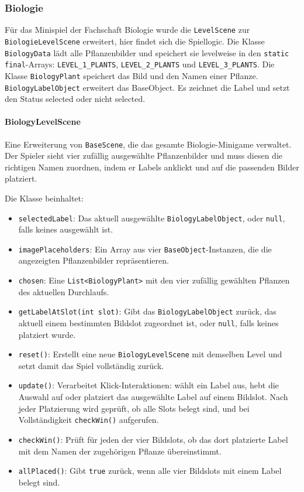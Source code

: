 \subsubsection{Biologie}

\begin{sloppypar}
    Für das Minispiel der Fachschaft Biologie wurde die \texttt{LevelScene} zur \texttt{BiologieLevelScene} erweitert, hier findet sich die Spiellogic.
    Die Klasse \texttt{BiologyData} lädt alle Pflanzenbilder und speichert sie levelweise in den \texttt{static final}-Arrays: \texttt{LEVEL\_1\_PLANTS}, \texttt{LEVEL\_2\_PLANTS} und \texttt{LEVEL\_3\_PLANTS}.
    Die Klasse \texttt{BiologyPlant} speichert das Bild und den Namen einer Pflanze.
    \texttt{BiologyLabelObject} erweitert das BaseObject. Es zeichnet die Label und setzt den Status selected oder nicht selected.
\end{sloppypar}

\paragraph{BiologyLevelScene}
Eine Erweiterung von \texttt{BaseScene}, die das gesamte Biologie-Minigame verwaltet.
Der Spieler sieht vier zufällig ausgewählte Pflanzenbilder und muss diesen die richtigen Namen zuordnen, indem er Labels anklickt und auf die passenden Bilder platziert.

Die Klasse beinhaltet:
\begin{sloppypar}
    \begin{itemize}
        \item \texttt{selectedLabel}: Das aktuell ausgewählte \texttt{BiologyLabelObject}, oder \texttt{null}, falls keines ausgewählt ist.
        \item \texttt{imagePlaceholders}: Ein Array aus vier \texttt{BaseObject}-Instanzen, die die angezeigten Pflanzenbilder repräsentieren.
        \item \texttt{chosen}: Eine \texttt{List<BiologyPlant>} mit den vier zufällig gewählten Pflanzen des aktuellen Durchlaufs.
        \item \texttt{getLabelAtSlot(int slot)}: Gibt das \texttt{BiologyLabelObject} zurück, das aktuell einem bestimmten Bildslot zugeordnet ist, oder \texttt{null}, falls keines platziert wurde.
        \item \texttt{reset()}: Erstellt eine neue \texttt{BiologyLevelScene} mit demselben Level und setzt damit das Spiel vollständig zurück.
        \item \texttt{update()}: Verarbeitet Klick-Interaktionen: wählt ein Label aus, hebt die Auswahl auf oder platziert das ausgewählte Label auf einem Bildslot. Nach jeder Platzierung wird geprüft, ob alle Slots belegt sind, und bei Vollständigkeit \texttt{checkWin()} aufgerufen.
        \item \texttt{checkWin()}: Prüft für jeden der vier Bildslots, ob das dort platzierte Label mit dem Namen der zugehörigen Pflanze übereinstimmt.
        \item \texttt{allPlaced()}: Gibt \texttt{true} zurück, wenn alle vier Bildslots mit einem Label belegt sind.
    \end{itemize}
\end{sloppypar}

